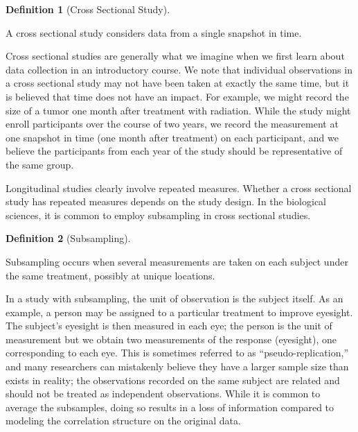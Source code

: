 \documentclass[
  letterpaper,
  DIV=11,
  numbers=noendperiod]{scrreprt}
\theoremstyle{definition}
\theoremstyle{definition}
\newtheorem{definition}{Definition}[chapter]
\theoremstyle{remark}
\begin{document}
\begin{definition}[Cross Sectional
Study]\protect\hypertarget{def-cross-sectional-study}{}\label{def-cross-sectional-study}

A cross sectional study considers data from a single snapshot in time.

\end{definition}

Cross sectional studies are generally what we imagine when we first
learn about data collection in an introductory course. We note that
individual observations in a cross sectional study may not have been
taken at exactly the same time, but it is believed that time does not
have an impact. For example, we might record the size of a tumor one
month after treatment with radiation. While the study might enroll
participants over the course of two years, we record the measurement at
one snapshot in time (one month after treatment) on each participant,
and we believe the participants from each year of the study should be
representative of the same group.

Longitudinal studies clearly involve repeated measures. Whether a cross
sectional study has repeated measures depends on the study design. In
the biological sciences, it is common to employ subsampling in cross
sectional studies.

\begin{definition}[Subsampling]\protect\hypertarget{def-subsampling}{}\label{def-subsampling}

Subsampling occurs when several measurements are taken on each subject
under the same treatment, possibly at unique locations.

\end{definition}

In a study with subsampling, the unit of observation is the subject
itself. As an example, a person may be assigned to a particular
treatment to improve eyesight. The subject's eyesight is then measured
in each eye; the person is the unit of measurement but we obtain two
measurements of the response (eyesight), one corresponding to each eye.
This is sometimes referred to as ``pseudo-replication,'' and many
researchers can mistakenly believe they have a larger sample size than
exists in reality; the observations recorded on the same subject are
related and should not be treated as independent observations. While it
is common to average the subsamples, doing so results in a loss of
information compared to modeling the correlation structure on the
original data.
\end{document}
